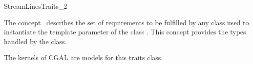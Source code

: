 

\begin{ccRefConcept}{StreamLinesTraits_2}


\ccDefinition
  
The concept \ccRefName\ describes the set of requirements to be
fulfilled by any class used to instantiate the template parameter of the class 
.
This concept provides the types handled by the
 class.

\ccTypes
{}
\ccGlue
{}
\ccGlue
{}
\ccGlue


\ccHasModels
The kernels of CGAL are models for this traits class. \\



\end{ccRefConcept}


